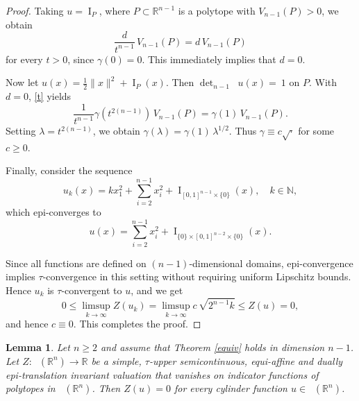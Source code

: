 \documentclass[11pt]{article}
\newtheorem{lema}[teo]{Lemma}
\theoremstyle{definition} %
\newcommand{\RR}{(\mathbb{R}^n)}
\DeclareMathOperator{\I}{I}
\DeclareMathOperator{\D}{D^2}
\DeclareMathOperator{\LP}{Conv_{lp}}
\begin{document}
\begin{proof}
Taking $u = \I_P$, where $P \subset \mathbb{R}^{n-1}$ is a polytope with $V_{n-1}(P) > 0$, we obtain
$$\frac{d}{t^{n-1}}\, V_{n-1}(P)= d\, V_{n-1}(P)$$
for every $t>0$, since $\gamma(0)=0$. This immediately implies that $d = 0$.   

Now let $u(x) = \frac{1}{2}\|x\|^2+\I_P(x)$.  Then $\det_{n-1} \D u(x) =~1$ on $P$. With $d=0$,  \eqref{t} yields
$$
\frac{1}{t^{n-1}} \gamma(t^{2(n-1)})\, V_{n-1}(P)
= \gamma(1)\, V_{n-1}(P).
$$
Setting $\lambda = t^{2(n-1)}$, we obtain
$
\gamma(\lambda) = \gamma(1)\,\lambda^{1/2}.
$
Thus $\gamma \equiv c\sqrt{\cdot}$ for some  $c \ge 0$. 

Finally, consider the sequence 
$$u_k(x)=kx_1^2+\sum_{i=2}^{n-1}x_i^2+\I_{[0,1]^{n-1}\times\{0\}}(x), \quad k\in\mathbb{N},$$ 
which epi-converges to 
$$u(x)= \sum_{i=2}^{n-1}x_i^2+\I_{\{0\}\times[0,1]^{n-2}\times\{0\}}(x).$$

Since all functions are defined on $(n-1)$-dimensional domains, epi-convergence implies $\tau$-convergence in this setting without requiring uniform Lipschitz bounds. Hence $u_k$ is $\tau$-convergent to $u$, and we get
$$0\le \limsup_{k\rightarrow \infty} Z(u_k)= \limsup_{k\rightarrow \infty} c\, \sqrt{2^{n-1}k}\leq Z(u)=0,$$
and hence $c\equiv 0$. This completes the proof.
\end{proof}

\begin{lema}\label{cylinder}
Let $n\ge 2$ and assume that Theorem \ref{equiv} holds in dimension $n-1$. Let $Z: \LP(\mathbb{R}^n)\rightarrow\mathbb{R}$ be a simple, $\tau$-upper semicontinuous,  equi-affine and dually epi-translation invariant valuation that vanishes on indicator functions of polytopes in $\LP\RR$. Then $Z(u)= 0$ for every cylinder function $u\in\LP\RR$.
\end{lema}
\end{document}
